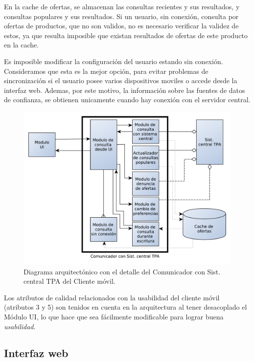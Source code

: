 En la \textsf{cache de ofertas}, se almacenan las consultas recientes y sus resultados, y consultas populares y sus resultados. Si un usuario, sin conexión, consulta por ofertas de productos, que no son validos, no es necesario verificar la validez de estos, ya que resulta imposible que existan resultados de ofertas de este producto en la cache.

Es imposible modificar la configuración del usuario estando sin conexión. Consideramos que esta es la mejor opción, para evitar problemas de sincronización si el usuario posee varios dispositivos moviles o accede desde la interfaz web. Ademas, por este motivo, la información sobre las fuentes de datos de confianza, se obtienen unicamente cuando hay conexión con el servidor central.

\begin{figure}[H]
	\centering
	\includegraphics[width=\textwidth]{graficos/arch/cliente_movil_comunicador.pdf}
	\caption{Diagrama arquitectónico con el detalle del \textsf{Comunicador con Sist. central TPA} del \textsf{Cliente móvil}.}
\end{figure}

Los atributos de calidad relacionados con la usabilidad del cliente móvil (atributos 3 y 5) son tenidos en cuenta en la arquitectura al tener desacoplado el \textsf{Módulo UI}, lo que hace que sea fácilmente modificable para lograr buena \emph{usabilidad}.

\subsection{Interfaz web}

